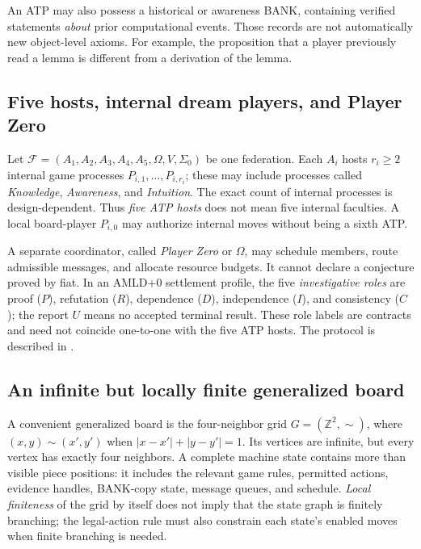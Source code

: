 \documentclass[11pt,letterpaper]{article}
\theoremstyle{definition}
\theoremstyle{remark}
\begin{document}
An ATP may also possess a historical or awareness BANK, containing verified statements \emph{about} prior computational events. Those records are not automatically new object-level axioms. For example, the proposition that a player previously read a lemma is different from a derivation of the lemma.

\subsection{Five hosts, internal dream players, and Player Zero}
Let $\mathcal F=(A_1,A_2,A_3,A_4,A_5,\Omega,V,\Sigma_0)$ be one federation. Each $A_i$ hosts $r_i\ge2$ internal game processes $P_{i,1},\ldots,P_{i,r_i}$; these may include processes called \emph{Knowledge}, \emph{Awareness}, and \emph{Intuition}. The exact count of internal processes is design-dependent. Thus \emph{five ATP hosts} does not mean five internal faculties. A local board-player $P_{i,0}$ may authorize internal moves without being a sixth ATP.

A separate coordinator, called \emph{Player Zero} or $\Omega$, may schedule members, route admissible messages, and allocate resource budgets. It cannot declare a conjecture proved by fiat. In an AMLD+0 settlement profile, the five \emph{investigative roles} are proof ($P$), refutation ($R$), dependence ($D$), independence ($I$), and consistency ($C$); the report $U$ means no accepted terminal result. These role labels are contracts and need not coincide one-to-one with the five ATP hosts. The protocol is described in \cite{tenneson-wcf,tenneson-bootstrap}.

\subsection{An infinite but locally finite generalized board}
A convenient generalized board is the four-neighbor grid $G=(\mathbb Z^2,\sim)$, where $(x,y)\sim(x',y')$ when $|x-x'|+|y-y'|=1$. Its vertices are infinite, but every vertex has exactly four neighbors. A complete machine state contains more than visible piece positions: it includes the relevant game rules, permitted actions, evidence handles, BANK-copy state, message queues, and schedule. \emph{Local finiteness} of the grid by itself does not imply that the state graph is finitely branching; the legal-action rule must also constrain each state's enabled moves when finite branching is needed.
\end{document}
